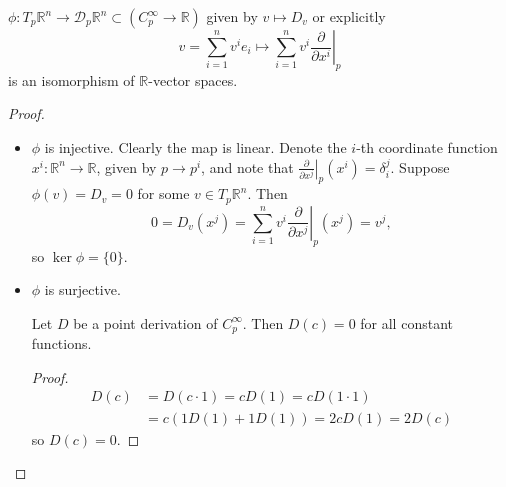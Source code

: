 \begin{theorem}
$\phi : T_p \mathbb{R}^n \to \mathcal{D}_p \mathbb{R}^n \subset
(C_p^\infty \to \mathbb{R})$ given by
$v \mapsto D_v$ or explicitly
$$
  v
= \sum_{i=1}^n v^i e_i
\mapsto
  \sum_{i=1}^n v^i \left.\frac{\partial}{\partial x^i}\right|_p
$$
 is an isomorphism of $\mathbb{R}$-vector spaces.
\end{theorem}

\begin{proof}

\begin{itemize}
  \item{
    $\phi$ is injective. Clearly the map is linear.
    Denote the $i$-th coordinate function
    $x^i : \mathbb{R}^n \to \mathbb{R}$, given by $p \to p^i$, and note
    that
    $\left.\frac{\partial}{\partial x^j}\right|_p (x^i) = \delta_i^j$.
    Suppose $\phi(v) = D_v = 0$ for some $v \in T_p \mathbb{R}^n$. Then
    $$
      0
    = D_v (x^j)
    = \sum_{i=1}^n
        v^i
        \left.
          \frac{\partial}
               {\partial x^j}
        \right|_p
          (x^j)
    = v^j,
    $$
    so $\ker \phi = \{ 0 \}$.
  }
  \item{
    $\phi$ is surjective.

    \begin{lemma}
      Let $D$ be a point derivation of $C_p^\infty$. Then $D(c) = 0$ for all constant
      functions.
    \end{lemma}
    \begin{proof}
      \begin{align*}
           D(c)
        &= D(c \cdot 1)
         = c D(1)
         = c D(1 \cdot 1) \\
        &= c (1 D(1) + 1 D(1))
         = 2 c D(1)
         = 2 D(c)
      \end{align*}
      so $D(c) = 0$.
    \end{proof}

}
\end{itemize}
\end{proof}
